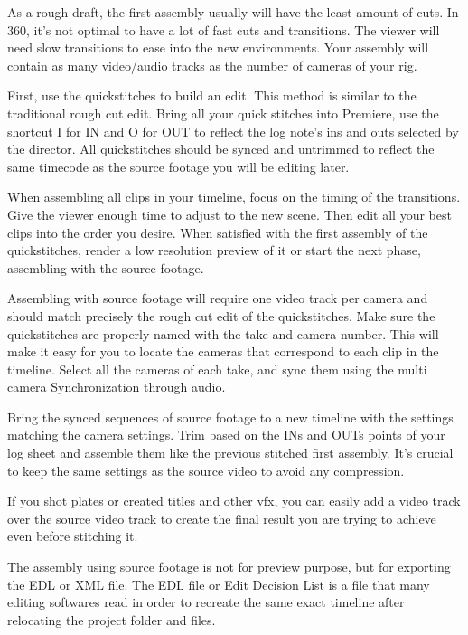 \begin{fullwidth}
As a rough draft, the first assembly usually will have the least amount of cuts. In 360, it’s not optimal to have a lot of fast cuts and transitions. The viewer will need slow transitions to ease into the new environments. Your assembly will contain as many video/audio tracks as the number of cameras of your rig. 

First, use the quickstitches to build an edit. This method is similar to the traditional rough cut edit. Bring all your quick stitches into Premiere, use the shortcut I for IN and O for OUT to reflect the log note’s ins and outs selected by the director. All quickstitches should be synced and untrimmed to reflect the same timecode as the source footage you will be editing later.

When assembling all clips in your timeline, focus on the timing of the transitions. Give the viewer enough time to adjust to the new scene. Then edit all your best clips into the order you desire. 
When satisfied with the first assembly of the quickstitches, render a low resolution preview of it or start the next phase, assembling with the source footage.


Assembling with source footage will require one video track per camera and should match precisely the rough cut edit of the quickstitches. Make sure the quickstitches are properly named with the take and camera number. This will make it easy for you to locate the cameras that correspond to each clip in the timeline. Select all the cameras of each take, and sync them using the multi camera Synchronization through audio.

Bring the synced sequences of source footage to a new timeline with the settings matching the camera settings. Trim based on the INs and OUTs points of your log sheet and assemble them like the previous stitched first assembly. It’s crucial to keep the same settings as the source video to avoid any compression. 

If you shot plates or created titles and other vfx, you can easily add a video track over the source video track to create the final result you are trying to achieve even before stitching it.


The assembly using source footage is not for preview purpose, but for exporting the EDL or XML file. The EDL file or Edit Decision List is a file that many editing softwares read in order to recreate the same exact timeline after relocating the project folder and files.



\clearpage
\end{fullwidth}